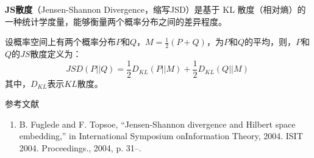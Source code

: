 
\textbf{JS散度}（Jensen-Shannon Divergence，缩写JSD）是基于 KL 散度（相对熵）的一种统计学度量，能够衡量两个概率分布之间的差异程度。

设概率空间上有两个概率分布$P$和$Q$，$M=\frac{1}{2}(P+Q)$，为$P$和$Q$的平均，则，$P$和$Q$的$JS$散度定义为：
\begin{equation}
JSD(P||Q)=\frac{1}{2}D_{KL}(P||M)+\frac{1}{2}D_{KL}(Q||M)~
\end{equation}
其中，$D_{KL}$表示$KL$散度。



参考文献
\begin{enumerate}
\item B. Fuglede and F. Topsoe, “Jensen-Shannon divergence and Hilbert space embedding,” in International Symposium onInformation Theory, 2004. ISIT 2004. Proceedings., 2004, p. 31–.
\end{enumerate}